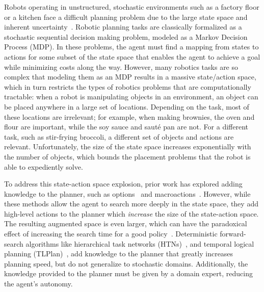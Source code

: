 \documentclass[conference]{IEEEtran}
\begin{document}
Robots operating in unstructured, stochastic environments such as a
factory floor or a kitchen face a difficult planning problem due to
the large state space and inherent
uncertainty~\citep{bollini12,knepper13}.  Robotic planning tasks are
classically formalized as a stochastic sequential decision making
problem, modeled as a Markov Decision Process (MDP). In these
problems, the agent must find a mapping from states to actions for
some subset of the state space that enables the agent to achieve a
goal while minimizing costs along the way. However, many robotics
tasks are so complex that modeling them as an MDP results in a massive
state/action space, which in turn restricts the types of robotics
problems that are computationally tractable: when a robot is
manipulating objects in an environment, an object can be placed
anywhere in a large set of locations.  Depending on the task, most of
these locations are irrelevant; for example, when making brownies, the
oven and flour are important, while the soy sauce and saut\'{e} pan
are not.  For a different task, such as stir-frying broccoli, a
different set of objects and actions are relevant.  Unfortunately, the
size of the state space increases exponentially with the number of
objects, which bounds the placement problems that the robot is able to
expediently solve.

To address this state-action space explosion, prior work has explored
adding knowledge to the planner, such as options~\cite{sutton99} and
macroactions~\cite{Botea:2005kx,Newton:2005vn}.  However, while these
methods allow the agent to search more deeply in the state space, they
add high-level actions to the planner which {\em increase} the size of
the state-action space.  The resulting augmented space is even larger,
which can have the paradoxical effect of increasing the search time
for a good policy~\cite{Jong:2008zr}.  
Deterministic forward-search algorithms like hierarchical task
networks (HTNs)~\citep{Nau:1999:SSH:1624312.1624357}, and temporal
logical planning (TLPlan)~\citep{Bacchus95usingtemporal,Bacchus99usingtemporal},
add knowledge to the planner that greatly increases planning speed, but do
not generalize to stochastic domains. Additionally, the knowledge
provided to the planner must be given by a domain expert, reducing the
agent's autonomy. 
\end{document}
